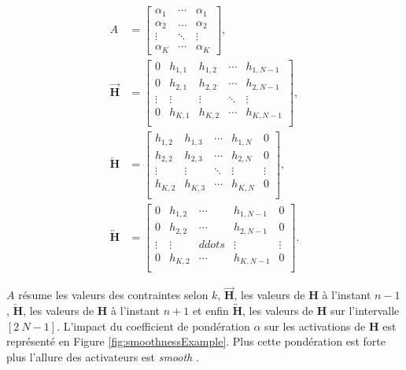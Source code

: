 \begin{subequations}
\begin{align}
    A &= 
\begin{bmatrix} 
\alpha_1 &  \cdots & \alpha_1  \\ 
\alpha_2 & \dots & \alpha_2  \\ 
\vdots & \ddots &  \vdots \\
\alpha_K & \cdots & \alpha_K
\end{bmatrix}, \label{eq:subeq1}\\
    \overrightarrow{\mathbf{H}} &= 
\begin{bmatrix}
0 & h_{1,1} & h_{1,2} & \cdots & h_{1,N-1}\\
0 & h_{2,1} & h_{2,2} & \cdots & h_{2,N-1}\\
\vdots & \vdots & \vdots & \ddots & \vdots\\
0 & h_{K,1} & h_{K,2} & \cdots & h_{K,N-1}\\
\end{bmatrix}, \label{eq:subeq2}\\
    \overleftarrow{\mathbf{H}} &= 
\begin{bmatrix}
h_{1,2} & h_{1,3} & \cdots & h_{1,N} & 0\\
h_{2,2} & h_{2,3} & \cdots & h_{2,N} & 0\\
\vdots & \vdots & \ddots & \vdots & \vdots\\
h_{K,2} & h_{K,3} & \cdots & h_{K,N} & 0\\
\end{bmatrix}, \label{eq:subeq3}\\
    \overleftrightarrow{\mathbf{H}} &= 
\begin{bmatrix}
0 & h_{1,2} & \cdots & h_{1,N-1} & 0\\
0 & h_{2,2} & \cdots & h_{2,N-1} & 0\\
\vdots & \vdots & ddots & \vdots & \vdots\\
0 & h_{K,2} & \cdots & h_{K,N-1} & 0\\
\end{bmatrix}. \label{eq:subeq5}
\end{align}
\end{subequations}

$A$ résume les valeurs des contraintes selon $k$, $\overrightarrow{\mathbf{H}}$, les valeurs de $\mathbf{H}$ à l'instant $n-1$, $\overleftarrow{\mathbf{H}}$, les valeurs de $\mathbf{H}$ à l'instant $n+1$ et enfin $\overleftrightarrow{\mathbf{H}}$, les valeurs de $\mathbf{H}$ sur l'intervalle $\left[2~N-1 \right]$. L'impact du coefficient de pondération $\alpha$ sur les activations de $\mathbf{H}$ est représenté en Figure \ref{fig:smoothnessExample}. Plus cette pondération est forte plus l'allure des activateurs est \textit{smooth} .

